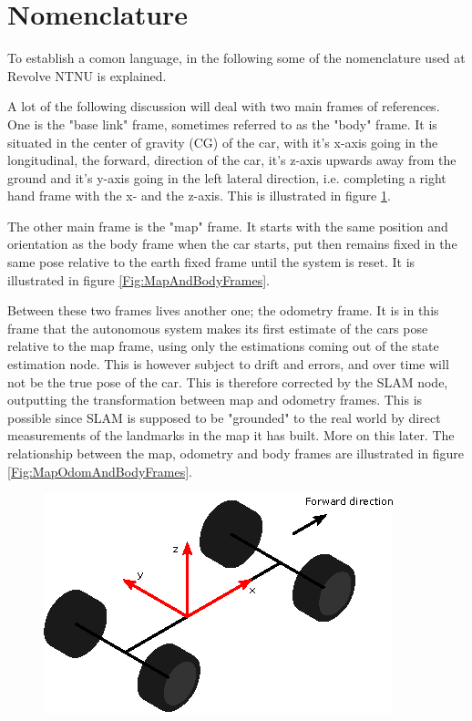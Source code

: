 \section{Nomenclature}

To establish a comon language, in the following some of the nomenclature used at Revolve NTNU is explained. 

A lot of the following discussion will deal with two main frames of references. One is the "base link" frame, sometimes referred to as the "body" frame. It is situated in the center of gravity (CG) of the car, with it's x-axis going in the longitudinal, the forward, direction of the car, it's z-axis upwards away from the ground and it's y-axis going in the left lateral direction, i.e. completing a right hand frame with the x- and the z-axis. This is illustrated in figure \ref{Fig:BodyFrame}. 

The other main frame is the "map" frame. It starts with the same position and orientation as the body frame when the car starts, put then remains fixed in the same pose relative to the earth fixed frame until the system is reset. It is illustrated in figure \ref{Fig:MapAndBodyFrames}. 

Between these two frames lives another one; the odometry frame. It is in this frame that the autonomous system makes its first estimate of the cars pose relative to the map frame, using only the estimations coming out of the state estimation node. This is however subject to drift and errors, and over time will not be the true pose of the car. This is therefore corrected by the SLAM node, outputting the transformation between map and odometry frames. This is possible since SLAM is supposed to be "grounded" to the real world by direct measurements of the landmarks in the map it has built. More on this later. The relationship between the map, odometry and body frames are illustrated in figure \ref{Fig:MapOdomAndBodyFrames}. 

\begin{figure}
    \centering
    \includegraphics[width=0.5\linewidth]{0_Images/2_Introduction/BaseLinkFrame.eps}
    \label{Fig:BodyFrame}
\end{figure}

